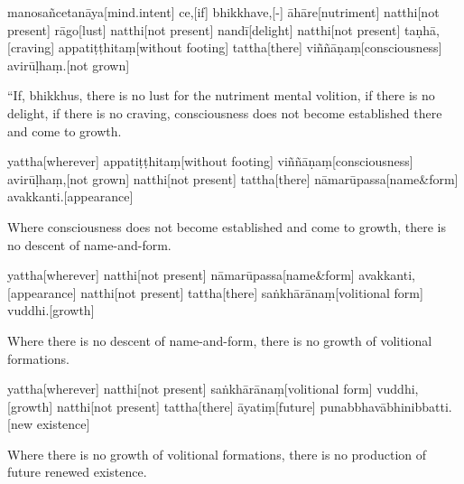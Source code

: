 \vskip 0.2in
\begin{samepage}
\begingl[glneveryline={\PaliGlossA,\PaliGlossB}]
manosañcetanāya[mind.intent] ce,[if] bhikkhave,[-] āhāre[nutriment] natthi[not present] rāgo[lust] natthi[not present] nandī[delight] natthi[not present] taṇhā,[craving] appatiṭṭhitaṃ[without footing] tattha[there] viññāṇaṃ[consciousness] avirūḷhaṃ.[not grown]
\endgl
\nopagebreak
\linespread{0.5}
\begin{spacin}{0.2}
{\PaliGlossFT “If, bhikkhus, there is no lust for the nutriment mental volition, if there is no delight, if there is no craving, consciousness does not become established there and come to growth.}
\end{spacin}
\vskip 12pt
\end{samepage}
\begin{samepage}
\begingl[glneveryline={\PaliGlossA,\PaliGlossB}]
yattha[wherever] appatiṭṭhitaṃ[without footing] viññāṇaṃ[consciousness] avirūḷhaṃ,[not grown] natthi[not present] tattha[there] nāmarūpassa[name\&form] avakkanti.[appearance]
\endgl
\nopagebreak
\linespread{0.5}
\begin{spacin}{0.2}
{\PaliGlossFT Where consciousness does not become established and come to growth, there is no descent of name-and-form.}
\end{spacin}
\vskip 12pt
\end{samepage}
\begin{samepage}
\begingl[glneveryline={\PaliGlossA,\PaliGlossB}]
yattha[wherever] natthi[not present] nāmarūpassa[name\&form] avakkanti,[appearance] natthi[not present] tattha[there] saṅkhārānaṃ[volitional form] vuddhi.[growth]
\endgl
\nopagebreak
\linespread{0.5}
\begin{spacin}{0.2}
{\PaliGlossFT Where there is no descent of name-and-form, there is no growth of volitional formations.}
\end{spacin}
\vskip 12pt
\end{samepage}
\begin{samepage}
\begingl[glneveryline={\PaliGlossA,\PaliGlossB}]
yattha[wherever] natthi[not present] saṅkhārānaṃ[volitional form] vuddhi,[growth] natthi[not present] tattha[there] āyatiṃ[future] punabbhavābhinibbatti.[new existence]
\endgl
\nopagebreak
\linespread{0.5}
\begin{spacin}{0.2}
{\PaliGlossFT Where there is no growth of volitional formations, there is no production of future renewed existence.}
\end{spacin}
\vskip 12pt
\end{samepage}

